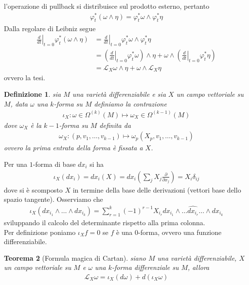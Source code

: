 \documentclass[oneside, 11pt]{amsbook}
\makeatletter
\newcommand{\0}{{(0)}}
\newcommand{\3}{{(3)}}
\theoremstyle{colonplain}
\newtheorem{thm}{Teorema}[chapter]
\theoremstyle{colondefinition}
\newtheorem{defn}[thm]{Definizione}
\theoremstyle{colonremark}
\numberwithin{equation}{chapter}
\renewcommand{\proofname}{Dimostrazione}
\renewenvironment{proof}[1][\proofname]{\par
  \pushQED{\qed}%
  \normalfont \topsep6\p@\@plus6\p@\relax
  \trivlist
  \item[\hskip\labelsep\bfseries #1:]\ignorespaces
}{%
  \popQED\endtrivlist\@endpefalse
}
\makeatother
\begin{document}
\begin{proof} l'operazione di pullback si distribuisce sul prodotto esterno, pertanto
\begin{align}
    \varphi^*_t(\omega \wedge \eta) = \varphi^*_t\omega \wedge \varphi^*_t\eta
\end{align}
Dalla regolare di Leibniz segue
\begin{align}
    \left.\frac{d}{dt}\right|_{t = 0}\varphi^*_t(\omega \wedge \eta) &= \left.\frac{d}{dt}\right|_{t = 0}\varphi^*_t\omega \wedge \varphi^*_t\eta \\
    &= \left(\left.\frac{d}{dt}\right|_{t = 0}\varphi^*_t\omega\right) \wedge \eta + \omega \wedge \left(\left.\frac{d}{dt}\right|_{t = 0} \varphi^*_t\eta\right) \\
    &= \mathcal{L}_X\omega \wedge \eta + \omega \wedge \mathcal{L}_X \eta
\end{align}
ovvero la tesi.
\end{proof}
\begin{defn} sia $M$ una varietà differenziabile e sia $X$ un campo vettoriale su $M$, data $\omega$ una $k$-forma su $M$ definiamo la contrazione
\begin{align}
    \iota_X : \omega \in \Omega^{(k)}(M) \mapsto \omega_X \in \Omega^{(k - 1)}(M)
\end{align}
dove $\omega_X$ è la $k - 1$-forma su $M$ definita da
\begin{align}
    \omega_X : (p, v_1, \dots, v_{k - 1}) \mapsto \omega_p(X_p, v_1, \dots, v_{k - 1})
\end{align}
ovvero la prima entrata della forma è fissata a $X$.
\end{defn}
Per una $1$-forma di base $dx_i$ si ha
\begin{align}
    \iota_X(dx_i) = dx_i(X) = dx_i\left(\sum_j X_j\frac{\partial}{\partial x_j}\right) = X_i\delta_{ij}
\end{align}
dove si è scomposto $X$ in termine della base delle derivazioni (vettori base dello spazio tangente). Osserviamo che
\begin{align}
    \iota_X(dx_{i_1} \wedge \dots \wedge dx_{i_k}) = \sum_{r = 1}^k (-1)^{r - 1}X_{i_r}dx_{i_1} \wedge \dots \widehat{dx_{i_r}} \dots \wedge dx_{i_k}
\end{align}
sviluppando il calcolo del determinante rispetto alla prima colonna. \\
Per definizione poniamo $\iota_X f = 0$ se $f$ è una $0$-forma, ovvero una funzione differenziabile.
\begin{thm}[Formula magica di Cartan]\label{CartanFormula} siano $M$ una varietà differenziabile, $X$ un campo vettoriale su $M$ e $\omega$ una $k$-forma differenziale su $M$, allora
\begin{align}
    \mathcal{L}_X\omega = \iota_X(d\omega) + d(\iota_X \omega)
\end{align}
\end{thm}
\end{document}
